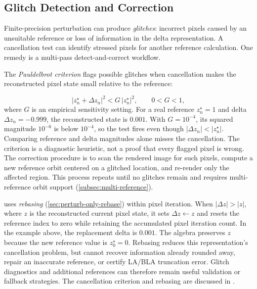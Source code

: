 \subsection{Glitch Detection and Correction}
\label{subsec:glitch-detection}

Finite-precision perturbation can produce \emph{glitches}: incorrect pixels
caused by an unsuitable reference or loss of information in the delta
representation.  A cancellation test can identify stressed pixels for
another reference calculation.  One remedy is a multi-pass
detect-and-correct workflow.

The \emph{Pauldelbrot criterion} flags possible glitches when cancellation
makes the reconstructed pixel state small relative to the reference:

\begin{equation}
  |z_n^\star+\Delta z_n|^2 < G\,|z_n^\star|^2,\qquad 0<G<1,
  \label{eq:pauldelbrot-criterion}
\end{equation}
where $G$ is an empirical sensitivity setting.  For a real reference
$z_n^\star=1$ and delta $\Delta z_n=-0.999$, the reconstructed state is
$0.001$.  With $G=10^{-4}$, its squared magnitude $10^{-6}$ is below
$10^{-4}$, so the test fires even though $|\Delta z_n|<|z_n^\star|$.
Comparing reference and delta magnitudes alone misses the cancellation.
The criterion is a diagnostic heuristic, not a proof that every flagged
pixel is wrong.  The correction procedure is to scan the rendered image for such pixels,
compute a new reference orbit centered on a glitched location, and
re-render only the affected region.  This process repeats until no
glitches remain and requires multi-reference orbit support
(\cref{subsec:multi-reference}).

\FractalShark{} uses \emph{rebasing} (\cref{sec:perturb-only-rebase})
within pixel iteration.  When $|\Delta z|>|z|$, where $z$ is the
reconstructed current pixel state, it sets $\Delta z\leftarrow z$ and
resets the reference index to zero while retaining the accumulated pixel
iteration count.  In the example above, the replacement delta is $0.001$.
The algebra preserves $z$ because the new reference value is $z_0^\star=0$.
Rebasing reduces this representation's cancellation problem, but cannot
recover information already rounded away, repair an inaccurate reference, or
certify LA/BLA truncation error.  Glitch diagnostics and additional references
can therefore remain useful validation or fallback strategies.
The cancellation criterion and rebasing are discussed in
\cite{HeilandAllen2021DeepZoom,HeilandAllen2022DeepZoom}.

